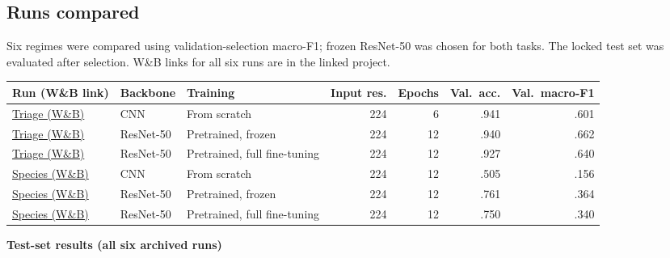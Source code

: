 \documentclass[11pt,a4paper]{article}
\begin{document}
\subsection{Runs compared}

Six regimes were compared using validation-selection macro-F1; frozen ResNet-50 was chosen for both tasks. The locked test set was evaluated after selection. W\&B links for all six runs are in the linked project.

\medskip
{\small
\begin{tabularx}{\linewidth}{@{}l l Y r r r r@{}}
\toprule
Run (W\&B link) & Backbone & Training & Input res. & Epochs & Val.\ acc. & Val.\ macro-F1 \\
\midrule
\href{https://wandb.ai/saleh-alanazi-ministry-of-interior/camera-trap-phase1/runs/6nqew908}{Triage (W\&B)} & CNN & From scratch & 224 & 6 & .941 & .601 \\
\href{https://wandb.ai/saleh-alanazi-ministry-of-interior/camera-trap-phase1/runs/kbij5lcv}{Triage (W\&B)} & ResNet-50 & Pretrained, frozen & 224 & 12 & .940 & .662 \\
\href{https://wandb.ai/saleh-alanazi-ministry-of-interior/camera-trap-phase1/runs/4bssmudy}{Triage (W\&B)} & ResNet-50 & Pretrained, full fine-tuning & 224 & 12 & .927 & .640 \\
\href{https://wandb.ai/saleh-alanazi-ministry-of-interior/camera-trap-phase1/runs/xbty4y66}{Species (W\&B)} & CNN & From scratch & 224 & 12 & .505 & .156 \\
\href{https://wandb.ai/saleh-alanazi-ministry-of-interior/camera-trap-phase1/runs/bfx7xgov}{Species (W\&B)} & ResNet-50 & Pretrained, frozen & 224 & 12 & .761 & .364 \\
\href{https://wandb.ai/saleh-alanazi-ministry-of-interior/camera-trap-phase1/runs/04gn2wgw}{Species (W\&B)} & ResNet-50 & Pretrained, full fine-tuning & 224 & 12 & .750 & .340 \\
\bottomrule
\end{tabularx}}

\medskip
\textbf{Test-set results (all six archived runs)}
\end{document}
